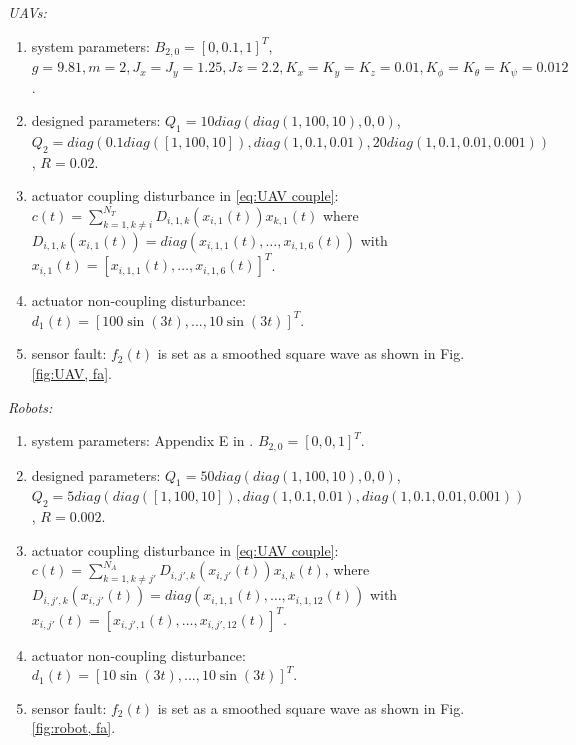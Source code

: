 \documentclass{ieeeaccess}
\begin{document}
\textit{UAVs:}\begin{enumerate}
    \item system parameters:
    $B_{2,0} = [0, 0.1, 1]^T$,
    $g = 9.81, m = 2,
    J_x = J_y = 1.25, Jz = 2.2,
    K_x = K_y = K_z = 0.01,
    K_\phi = K_\theta = K_\psi = 0.012$.

    \item designed parameters: 
    $Q_1 = 10diag(diag(1,100,10)\mathbin{,} 0\mathbin{,} 0)$, 
    $Q_2 = diag(0.1diag([1\mathbin{,} 100\mathbin{,} 10]), diag(1,0.1\mathbin{,} 0.01), 20diag(1,0.1,0.01 ,0.001))$, 
    $R = 0.02$.

    \item actuator coupling disturbance in \ref{eq:UAV couple}:
    \\$c(t) = \sum_{k = 1, k \neq i}^{N_T}D_{i, 1, k}(x_{i, 1}(t))x_{k, 1}(t)$ where $D_{i, 1, k}(x_{i, 1}(t)) = diag(x_{i, 1, 1}(t)\mathbin{,}\dots\mathbin{,}x_{i, 1, 6}(t))$ with $x_{i, 1}(t) = [x_{i, 1, 1}(t)\mathbin{,}\dots\mathbin{,}x_{i, 1, 6}(t)]^T$.
    \item actuator non-coupling disturbance: $d_1(t) = [100\sin(3t)\mathbin{,} ...\mathbin{,} 10\sin(3t)]^T$.
    \item sensor fault: $f_2(t)$ is set as a smoothed square wave as shown in Fig. \ref{fig:UAV, fa}.
\end{enumerate}

\textit{Robots:} \begin{enumerate}
    \item system parameters: Appendix E in \cite{ourrobot}. $B_{2,0} = [0, 0, 1]^T$.
    \item designed parameters:
    $Q_1 = 50diag(diag(1,100,10)\mathbin{,} 0\mathbin{,} 0)$, 
    $Q_2 = 5diag(diag([1\mathbin{,} 100\mathbin{,} 10]), diag(1,0.1\mathbin{,}0.01)\mathbin{,} diag(1,0.1,0.01,0.001))$, 
    $R = 0.002$.
    \item actuator coupling disturbance in \ref{eq:UAV couple}:
    \\ $c(t) = \sum_{k = 1, k \neq j'}^{N_A}D_{i, j', k}(x_{i, j'}(t))x_{i, k}(t)$, where $D_{i, j', k}(x_{i, j'}(t)) = diag(x_{i, 1, 1}(t)\mathbin{,}\dots\mathbin{,}x_{i, 1, 12}(t))$ with $x_{i, j'}(t) = [x_{i, j', 1}(t)\mathbin{,}\dots\mathbin{,}x_{i, j', 12}(t)]^T$.
    \item actuator non-coupling disturbance: $d_1(t) = [10\sin(3t)\mathbin{,} ...\mathbin{,} 10\sin(3t)]^T$.
    \item sensor fault: $f_2(t)$ is set as a smoothed square wave as shown in Fig. \ref{fig:robot, fa}.
\end{enumerate}
\end{document}
